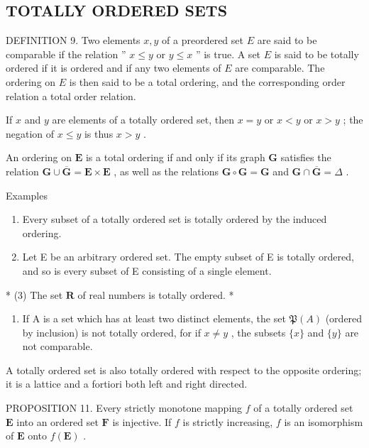 \subsection{TOTALLY ORDERED SETS}

DEFINITION 9. Two elements \(x, y\) of a preordered set \(E\) are said to be comparable if the relation '' \(x \leqslant y\) or \(y \leqslant x\) '' is true. A set \(E\) is said to be totally ordered if it is ordered and if any two elements of \(E\) are comparable. The ordering on \(E\) is then said to be a total ordering, and the corresponding order relation a total order relation.

If \(x\) and \(y\) are elements of a totally ordered set, then \(x = y\) or \(x < y\) or \(x > y\) ; the negation of \(x \leqslant y\) is thus \(x > y\) .

An ordering on \(\mathbf{E}\) is a total ordering if and only if its graph \(\mathbf{G}\) satisfies the relation \(\mathbf{G} \cup \overline{\mathbf{G}} = \mathbf{E} \times \mathbf{E}\) , as well as the relations \(\mathbf{G} \circ \mathbf{G} = \mathbf{G}\) and \(\mathbf{G} \cap \overline{\mathbf{G}} = \Delta\) .

Examples

\begin{enumerate}
\def\labelenumi{(\arabic{enumi})}
\item
  Every subset of a totally ordered set is totally ordered by the induced ordering.
\item
  Let E be an arbitrary ordered set. The empty subset of E is totally ordered, and so is every subset of E consisting of a single element.
\end{enumerate}

* (3) The set \(\mathbf{R}\) of real numbers is totally ordered. *

\begin{enumerate}
\def\labelenumi{(\arabic{enumi})}
\setcounter{enumi}{3}
\tightlist
\item
  If A is a set which has at least two distinct elements, the set \(\mathfrak{P}(A)\) (ordered by inclusion) is not totally ordered, for if \(x \neq y\) , the subsets \(\{x\}\) and \(\{y\}\) are not comparable.
\end{enumerate}

A totally ordered set is also totally ordered with respect to the opposite ordering; it is a lattice and a fortiori both left and right directed.

PROPOSITION 11. Every strictly monotone mapping \(f\) of a totally ordered set \(\mathbf{E}\) into an ordered set \(\mathbf{F}\) is injective. If \(f\) is strictly increasing, \(f\) is an isomorphism of \(\mathbf{E}\) onto \(f(\mathbf{E})\) .

